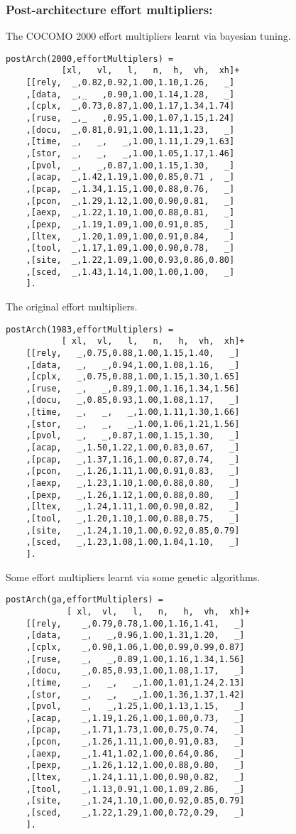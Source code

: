 \subsubsection{ Post-architecture effort multipliers:
}
 The COCOMO 2000 effort multipliers learnt
via bayesian tuning.  \begin{Verbatim}
postArch(2000,effortMultiplers) =
           [xl,   vl,   l,   n,  h,  vh,  xh]+
    [[rely,  _,0.82,0.92,1.00,1.10,1.26,   _]
    ,[data,  _,_   ,0.90,1.00,1.14,1.28,   _]
    ,[cplx,  _,0.73,0.87,1.00,1.17,1.34,1.74]
    ,[ruse,  _,_   ,0.95,1.00,1.07,1.15,1.24]
    ,[docu,  _,0.81,0.91,1.00,1.11,1.23,   _]
    ,[time,  _,   _,   _,1.00,1.11,1.29,1.63]
    ,[stor,  _,   _,   _,1.00,1.05,1.17,1.46]
    ,[pvol,  _,   _,0.87,1.00,1.15,1.30,   _]
    ,[acap,  _,1.42,1.19,1.00,0.85,0.71 ,  _]
    ,[pcap,  _,1.34,1.15,1.00,0.88,0.76,   _]
    ,[pcon,  _,1.29,1.12,1.00,0.90,0.81,   _]
    ,[aexp,  _,1.22,1.10,1.00,0.88,0.81,   _]
    ,[pexp,  _,1.19,1.09,1.00,0.91,0.85,   _]
    ,[ltex,  _,1.20,1.09,1.00,0.91,0.84,   _]
    ,[tool,  _,1.17,1.09,1.00,0.90,0.78,   _]
    ,[site,  _,1.22,1.09,1.00,0.93,0.86,0.80]
    ,[sced,  _,1.43,1.14,1.00,1.00,1.00,   _]
    ].
\end{Verbatim}
 The original effort multipliers.  \begin{Verbatim}
postArch(1983,effortMultiplers) =
           [ xl,  vl,   l,   n,   h,  vh,  xh]+
    [[rely,   _,0.75,0.88,1.00,1.15,1.40,   _]
    ,[data,   _,   _,0.94,1.00,1.08,1.16,   _]
    ,[cplx,   _,0.75,0.88,1.00,1.15,1.30,1.65]
    ,[ruse,   _,   _,0.89,1.00,1.16,1.34,1.56]
    ,[docu,   _,0.85,0.93,1.00,1.08,1.17,   _]
    ,[time,   _,   _,   _,1.00,1.11,1.30,1.66]
    ,[stor,   _,   _,   _,1.00,1.06,1.21,1.56]
    ,[pvol,   _,   _,0.87,1.00,1.15,1.30,   _]
    ,[acap,   _,1.50,1.22,1.00,0.83,0.67,   _]
    ,[pcap,   _,1.37,1.16,1.00,0.87,0.74,   _]
    ,[pcon,   _,1.26,1.11,1.00,0.91,0.83,   _]
    ,[aexp,   _,1.23,1.10,1.00,0.88,0.80,   _]
    ,[pexp,   _,1.26,1.12,1.00,0.88,0.80,   _]
    ,[ltex,   _,1.24,1.11,1.00,0.90,0.82,   _]
    ,[tool,   _,1.20,1.10,1.00,0.88,0.75,   _]
    ,[site,   _,1.24,1.10,1.00,0.92,0.85,0.79]
    ,[sced,   _,1.23,1.08,1.00,1.04,1.10,   _]
    ].
\end{Verbatim}
 Some effort multipliers learnt via some
genetic algorithms.  \begin{Verbatim}
postArch(ga,effortMultiplers) =
            [ xl,  vl,   l,   n,   h,  vh,  xh]+
    [[rely,    _,0.79,0.78,1.00,1.16,1.41,   _]
    ,[data,    _,   _,0.96,1.00,1.31,1.20,   _]
    ,[cplx,    _,0.90,1.06,1.00,0.99,0.99,0.87]
    ,[ruse,    _,   _,0.89,1.00,1.16,1.34,1.56]
    ,[docu,    _,0.85,0.93,1.00,1.08,1.17,   _]
    ,[time,    _,   _,   _,1.00,1.01,1.24,2.13]
    ,[stor,    _,   _,   _,1.00,1.36,1.37,1.42]
    ,[pvol,    _,   _,1.25,1.00,1.13,1.15,   _]
    ,[acap,    _,1.19,1.26,1.00,1.00,0.73,   _]
    ,[pcap,    _,1.71,1.73,1.00,0.75,0.74,   _]
    ,[pcon,    _,1.26,1.11,1.00,0.91,0.83,   _]
    ,[aexp,    _,1.41,1.02,1.00,0.64,0.86,   _]
    ,[pexp,    _,1.26,1.12,1.00,0.88,0.80,   _]
    ,[ltex,    _,1.24,1.11,1.00,0.90,0.82,   _]
    ,[tool,    _,1.13,0.91,1.00,1.09,2.86,   _]
    ,[site,    _,1.24,1.10,1.00,0.92,0.85,0.79]
    ,[sced,    _,1.22,1.29,1.00,0.72,0.29,   _]
    ].
\end{Verbatim}
